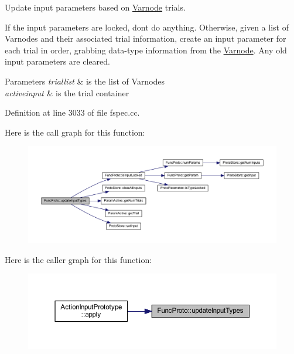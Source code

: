 Update input parameters based on \mbox{\hyperlink{class_varnode}{Varnode}} trials. 

If the input parameters are locked, don\textquotesingle{}t do anything. Otherwise, given a list of Varnodes and their associated trial information, create an input parameter for each trial in order, grabbing data-\/type information from the \mbox{\hyperlink{class_varnode}{Varnode}}. Any old input parameters are cleared. 
\begin{DoxyParams}{Parameters}
{\em triallist} & is the list of Varnodes \\
\hline
{\em activeinput} & is the trial container \\
\hline
\end{DoxyParams}


Definition at line 3033 of file fspec.\+cc.

Here is the call graph for this function\+:
\nopagebreak
\begin{figure}[H]
\begin{center}
\leavevmode
\includegraphics[width=350pt]{class_func_proto_acb98890f848bc9e267c62c30e58a7f5f_cgraph}
\end{center}
\end{figure}
Here is the caller graph for this function\+:
\nopagebreak
\begin{figure}[H]
\begin{center}
\leavevmode
\includegraphics[width=350pt]{class_func_proto_acb98890f848bc9e267c62c30e58a7f5f_icgraph}
\end{center}
\end{figure}
\mbox{\label{class_func_proto_a882e34d08f3e4e44ba5aa25b87c84bfe}} 

